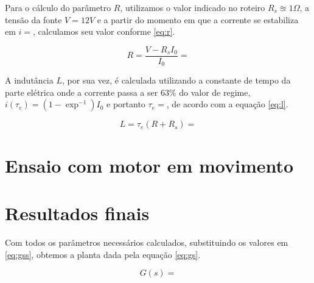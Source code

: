 \documentclass{article}
\begin{document}
Para o cálculo do parâmetro $R$, utilizamos o valor indicado no roteiro\cite{bb:roteiro} $R_s\approxeq1 \Omega$, a tensão da fonte $V=12 V$ e a partir do momento em que a corrente se estabiliza em $i=%
$, calculamos seu valor conforme \ref{eq:r}.

\begin{equation}
\label{eq:r}
R = \frac{V-R_sI_0}{I_0}=%
\end{equation}

A indutância $L$, por sua vez, é calculada utilizando a constante de tempo da parte elétrica onde a corrente passa a ser $63\%$ do valor de regime, $i(\tau_e)=(1-\exp^{-1})I_0$ e portanto
$\tau_e=%
$, de acordo com a equação \ref{eq:l}.

\begin{equation}
\label{eq:l}
L = \tau_e(R+R_s)=%
\end{equation}

\section{Ensaio com motor em movimento}

\section{Resultados finais}
Com todos os parâmetros necessários calculados, substituindo os valores em \ref{eq:gss}, obtemos a planta dada pela equação \ref{eq:gs}.

\begin{equation}
\label{eq:gs}
G(s)=%
\end{equation}


\begin{thebibliography}{widestlabel}
\end{thebibliography}
\end{document}

